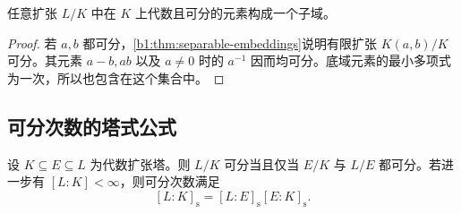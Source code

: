 \begin{proposition}\label{b1:prop:separable-subfield}
	任意扩张 \(L/K\) 中在 \(K\) 上代数且可分的元素构成一个子域。
\end{proposition}
\begin{proof}
	若 \(a,b\) 都可分，\cref{b1:thm:separable-embeddings}说明有限扩张 \(K(a,b)/K\) 可分。其元素 \(a-b,ab\) 以及 \(a\neq0\) 时的 \(a^{-1}\) 因而均可分。底域元素的最小多项式为一次，所以也包含在这个集合中。
\end{proof}

\subsection{可分次数的塔式公式}
\label{b1:subsec:1602:02}

\begin{theorem}\label{b1:thm:separable-degree-tower}
	设 \(K\subseteq E\subseteq L\) 为代数扩张塔。则 \(L/K\) 可分当且仅当 \(E/K\) 与 \(L/E\) 都可分。若进一步有 \([L:K]<\infty\)，则可分次数满足
	\[
		[L:K]_{\mathrm s}=[L:E]_{\mathrm s}[E:K]_{\mathrm s}.
	\]
\end{theorem}
